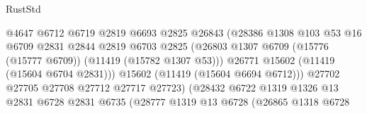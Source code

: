 \begin{lexlean}{RustStd}
\begin{coremodule}
                                            @4647
                                            @6712
                                            @6719
                                            @2819
                                            @6693
                                            @2825
                                            @26843
                                            (@28386
                                              @1308
                                              @103
                                              @53
                                              @16
                                              @6709
                                              @2831
                                              @2844
                                              @2819
                                              @6703
                                              @2825
                                              (@26803
                                                @1307
                                                @6709
                                                (@15776 (@15777 @6709))
                                                (@11419 (@15782 @1307 @53)))
                                              @26771
                                              @15602
                                              (@11419 (@15604 @6704 @2831)))
                                            @15602
                                            (@11419 (@15604 @6694 @6712)))
                                          @27702
                                          @27705
                                          @27708
                                          @27712
                                          @27717
                                          @27723)
                                        (@28432
                                          @6722
                                          @1319
                                          @1326
                                          @13
                                          @2831
                                          @6728
                                          @2831
                                          @6735
                                          (@28777
                                            @1319
                                            @13
                                            @6728
                                            (@26865
                                              @1318
                                              @6728

\end{coremodule}
\end{lexlean}
